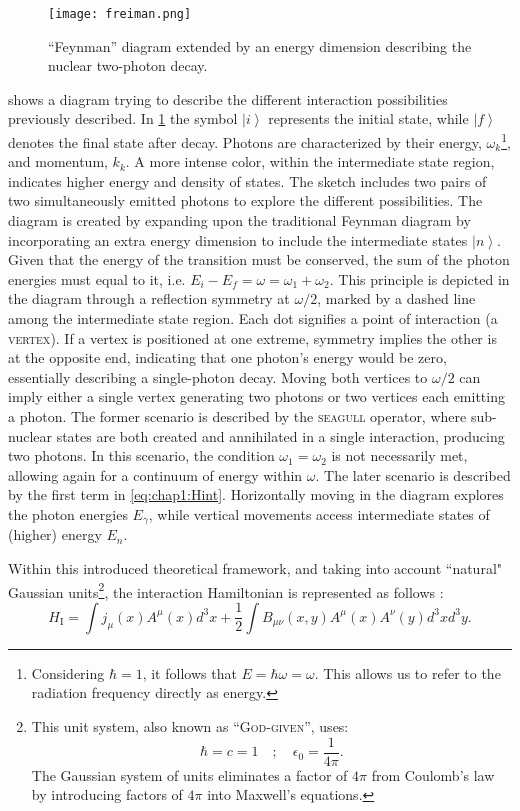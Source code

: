 \begin{figure}[hbt]
    \centering
    \texttt{[image: freiman.png]}
    \caption{``Feynman'' diagram extended by an energy dimension describing the nuclear two-photon decay.}
    \label{fig:chap1:freiman}
\end{figure}

 shows a diagram trying to describe the different interaction possibilities previously described. In \cref{fig:chap1:freiman} the symbol \(\left| i \right\rangle\) represents the initial state, while \(\left| f \right\rangle\) denotes the final state after decay. Photons are characterized by their energy, \(\omega_k\)\footnote{Considering $\hbar=1$, it follows that $E=\hbar\omega=\omega$. This allows us to refer to the radiation frequency directly as energy.}, and momentum, \(k_k\). A more intense color, within the intermediate state region, indicates higher energy and density of states. The sketch includes two pairs of two simultaneously emitted photons to explore the different possibilities.
The diagram is created by expanding upon the traditional Feynman diagram by incorporating an extra energy dimension to include the intermediate states \(\left| n \right\rangle\). Given that the energy of the transition must be conserved, the sum of the photon energies must equal to it, i.e. \(E_i - E_f = \omega = \omega_1 + \omega_2 \). This principle is depicted in the diagram through a reflection symmetry at \(\omega/2\), marked by a dashed line among the intermediate state region. 
Each dot signifies a point of interaction (a \textsc{vertex}). If a vertex is positioned at one extreme, symmetry implies the other is at the opposite end, indicating that one photon's energy would be zero, essentially describing a single-photon decay. 
Moving both vertices to \(\omega/2\) can imply either a single vertex generating two photons or two vertices each emitting a photon. The former scenario is described by the \textsc{seagull} operator, where sub-nuclear states are both created and annihilated in a single interaction, producing two photons. In this scenario, the condition \(\omega_1 = \omega_2\) is not necessarily met, allowing again for a continuum of energy within $\omega$. The later scenario is described by the first term in \cref{eq:chap1:Hint}. Horizontally moving in the diagram explores the photon energies $E_\gamma$, while vertical movements access intermediate states of (higher) energy $E_n$.

Within this introduced theoretical framework, and taking into account ``natural" Gaussian units\footnote{This unit system, also known as ``\textsc{God-given}'', uses: \[\hbar = c = 1 \quad;\quad \epsilon_0 = \frac{1}{4\pi}.\] The Gaussian system of units eliminates a factor of $4\pi$ from Coulomb's law by introducing factors of $4\pi$ into Maxwell's equations.}, the interaction Hamiltonian is represented as follows \cite{Kramp-1987}:
\begin{equation}
    H_{\mathrm{I}} = \int j_\mu(x) A^\mu(x) d^3x + \frac{1}{2} \int B_{\mu\nu}(x, y) A^\mu(x) A^\nu(y) d^3x d^3y.
    \label{eq:chap1:Hint}
\end{equation}

